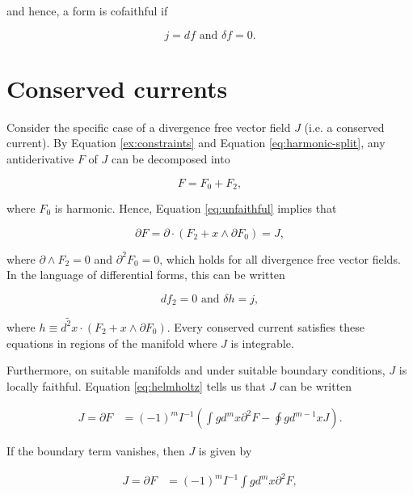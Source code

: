 \documentclass[twocolumn]{article}
\begin{document}
and hence, a form is cofaithful if

\begin{equation}
  j = df \text{ and } \delta f = 0.
\end{equation}

\section{Conserved currents}

Consider the specific case of a divergence free vector field $J$ (i.e. a conserved current). By Equation \ref{ex:constraints} and Equation \ref{eq:harmonic-split}, any antiderivative $F$ of $J$ can be decomposed into 

\begin{equation}
  F = F_0 + F_2,
\end{equation}

where $F_0$ is harmonic. Hence, Equation \ref{eq:unfaithful} implies that

\begin{equation}
  \partial F = \partial \cdot (F_2 + x \wedge \partial F_0) = J, \label{eq:coexact}
\end{equation}

where $\partial \wedge F_2 = 0$ and $\partial^2 F_0 = 0$, which holds for all divergence free vector fields. In the language of differential forms, this can be written

\begin{equation}
  d f_2 = 0 \text{ and } \delta h = j,
\end{equation}

where $h \equiv \widetilde{d^{2}x} \cdot (F_2 + x \wedge \partial F_0)$. Every conserved current satisfies these equations in regions of the manifold where $J$ is integrable.

Furthermore, on suitable manifolds and under suitable boundary conditions, $J$ is locally faithful. Equation \ref{eq:helmholtz} tells us that $J$ can be written

\begin{align}
  J = \partial F &= (-1)^m I^{-1} \left(\int g d^{m}x \partial^2 F - \oint g d^{m-1}x J \right).\label{eq:conditions}
\end{align}

If the boundary term vanishes, then $J$ is given by

\begin{align}
  J = \partial F &= (-1)^m I^{-1} \int g d^{m}x \partial^2 F,\label{eq:satisfied}
\end{align}
\end{document}
